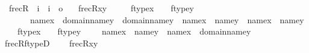 \begin{isabellebody}
\isanewline
\ \ frecR\ {\isacharcolon}{\kern0pt}{\isacharcolon}{\kern0pt}\ {\isachardoublequoteopen}i\ {\isasymRightarrow}\ i\ {\isasymRightarrow}\ o{\isachardoublequoteclose}\ \isanewline
\ \ {\isachardoublequoteopen}frecR{\isacharparenleft}{\kern0pt}x{\isacharcomma}{\kern0pt}y{\isacharparenright}{\kern0pt}\ {\isasymequiv}\isanewline
\ \ \ \ {\isacharparenleft}{\kern0pt}ftype{\isacharparenleft}{\kern0pt}x{\isacharparenright}{\kern0pt}\ {\isacharequal}{\kern0pt}\ {}\ {\isasymand}\ ftype{\isacharparenleft}{\kern0pt}y{\isacharparenright}{\kern0pt}\ {\isacharequal}{\kern0pt}\ {}\ \isanewline
\ \ \ \ \ \ {\isasymand}\ {\isacharparenleft}{\kern0pt}name{}{\isacharparenleft}{\kern0pt}x{\isacharparenright}{\kern0pt}\ {\isasymin}\ domain{\isacharparenleft}{\kern0pt}name{}{\isacharparenleft}{\kern0pt}y{\isacharparenright}{\kern0pt}{\isacharparenright}{\kern0pt}\ {\isasymunion}\ domain{\isacharparenleft}{\kern0pt}name{}{\isacharparenleft}{\kern0pt}y{\isacharparenright}{\kern0pt}{\isacharparenright}{\kern0pt}\ {\isasymand}\ {\isacharparenleft}{\kern0pt}name{}{\isacharparenleft}{\kern0pt}x{\isacharparenright}{\kern0pt}\ {\isacharequal}{\kern0pt}\ name{}{\isacharparenleft}{\kern0pt}y{\isacharparenright}{\kern0pt}\ {\isasymor}\ name{}{\isacharparenleft}{\kern0pt}x{\isacharparenright}{\kern0pt}\ {\isacharequal}{\kern0pt}\ name{}{\isacharparenleft}{\kern0pt}y{\isacharparenright}{\kern0pt}{\isacharparenright}{\kern0pt}{\isacharparenright}{\kern0pt}{\isacharparenright}{\kern0pt}\isanewline
\ \ \ {\isasymor}\ {\isacharparenleft}{\kern0pt}ftype{\isacharparenleft}{\kern0pt}x{\isacharparenright}{\kern0pt}\ {\isacharequal}{\kern0pt}\ {}\ {\isasymand}\ ftype{\isacharparenleft}{\kern0pt}y{\isacharparenright}{\kern0pt}\ {\isacharequal}{\kern0pt}\ \ {}\ {\isasymand}\ name{}{\isacharparenleft}{\kern0pt}x{\isacharparenright}{\kern0pt}\ {\isacharequal}{\kern0pt}\ name{}{\isacharparenleft}{\kern0pt}y{\isacharparenright}{\kern0pt}\ {\isasymand}\ name{}{\isacharparenleft}{\kern0pt}x{\isacharparenright}{\kern0pt}\ {\isasymin}\ domain{\isacharparenleft}{\kern0pt}name{}{\isacharparenleft}{\kern0pt}y{\isacharparenright}{\kern0pt}{\isacharparenright}{\kern0pt}{\isacharparenright}{\kern0pt}{\isachardoublequoteclose}\isanewline
\isanewline
{}\isamarkupfalse%
\ frecR{\isacharunderscore}{\kern0pt}ftypeD\ {\isacharcolon}{\kern0pt}\isanewline
\ \ \ {\isachardoublequoteopen}frecR{\isacharparenleft}{\kern0pt}x{\isacharcomma}{\kern0pt}y{\isacharparenright}{\kern0pt}{\isachardoublequoteclose}\isanewline

\end{isabellebody}
